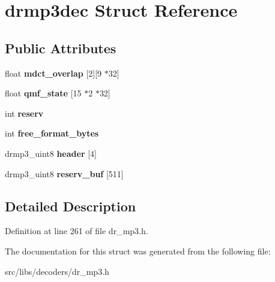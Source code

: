 \hypertarget{structdrmp3dec}{\section{drmp3dec Struct Reference}
\label{structdrmp3dec}
}
\subsection*{Public Attributes}
\begin{DoxyCompactItemize}
\item 
\hypertarget{structdrmp3dec_aa3a8b3465682a3ab6bd800341617ee7e}{float {\bfseries mdct\-\_\-overlap} \mbox{[}2\mbox{]}\mbox{[}9 $\ast$32\mbox{]}}\label{structdrmp3dec_aa3a8b3465682a3ab6bd800341617ee7e}

\item 
\hypertarget{structdrmp3dec_ad3cb6c01e5deee7e05264f61b9b9a5cc}{float {\bfseries qmf\-\_\-state} \mbox{[}15 $\ast$2 $\ast$32\mbox{]}}\label{structdrmp3dec_ad3cb6c01e5deee7e05264f61b9b9a5cc}

\item 
\hypertarget{structdrmp3dec_a81df7d1c59e3ce43b7512fe06f4a7630}{int {\bfseries reserv}}\label{structdrmp3dec_a81df7d1c59e3ce43b7512fe06f4a7630}

\item 
\hypertarget{structdrmp3dec_a3d9913952fef5b67f9c064d56650cd1e}{int {\bfseries free\-\_\-format\-\_\-bytes}}\label{structdrmp3dec_a3d9913952fef5b67f9c064d56650cd1e}

\item 
\hypertarget{structdrmp3dec_a8a3b25354e2c1182a8f1f8619206a40c}{drmp3\-\_\-uint8 {\bfseries header} \mbox{[}4\mbox{]}}\label{structdrmp3dec_a8a3b25354e2c1182a8f1f8619206a40c}

\item 
\hypertarget{structdrmp3dec_a1f1c567dc65ff34b11d545458c95282d}{drmp3\-\_\-uint8 {\bfseries reserv\-\_\-buf} \mbox{[}511\mbox{]}}\label{structdrmp3dec_a1f1c567dc65ff34b11d545458c95282d}

\end{DoxyCompactItemize}


\subsection{Detailed Description}


Definition at line 261 of file dr\-\_\-mp3.\-h.



The documentation for this struct was generated from the following file\-:\begin{DoxyCompactItemize}
\item 
src/libs/decoders/dr\-\_\-mp3.\-h\end{DoxyCompactItemize}
